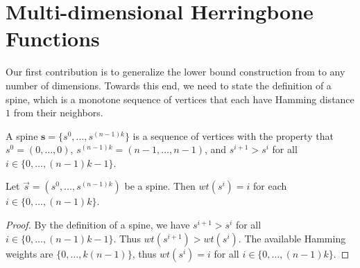 \documentclass[11pt]{article}
\begin{document}

\section{Multi-dimensional Herringbone Functions} \label{sec:multi_dim_herringbones}

Our first contribution is to generalize the lower bound  construction from \cite{etessami2019tarski} to any number of dimensions. Towards this end, we need to state the definition of a spine, which is 
a monotone sequence of vertices that each have Hamming distance $1$ from their neighbors.


\begin{definition}[Spine] \label{def:spine}
A spine $\mathbf{s} = \{s^0, \ldots, s^{(n-1)k}\}$ is a sequence of vertices with the property that $s^0 = (0, \ldots, 0)$, $s^{(n-1)k} = (n-1, \ldots, n-1)$, and $s^{i+1} > s^i$ for all $i \in \{0, \ldots, (n-1)k-1\}$.
\end{definition}

\begin{lemma} \label{lem:weight_of_spine_vertex}
    Let $\vec{s} = (s^0, \ldots, s^{(n-1)k})$ be a spine. Then $wt(s^i) = i$ for each $ i \in \{0, \ldots, (n-1)k\}$.
\end{lemma}
\begin{proof}
    By the definition of a spine, we have $s^{i+1} > s^i$ for all $i \in \{0, \ldots, (n-1)k-1\}$. Thus $wt(s^{i+1}) > wt(s^i)$. The available Hamming weights are $\{0, \ldots, k(n-1)\}$, thus $wt(s^i) = i$ for all $i \in \{0, \ldots, (n-1)k\}$.
\end{proof}
\end{document}
